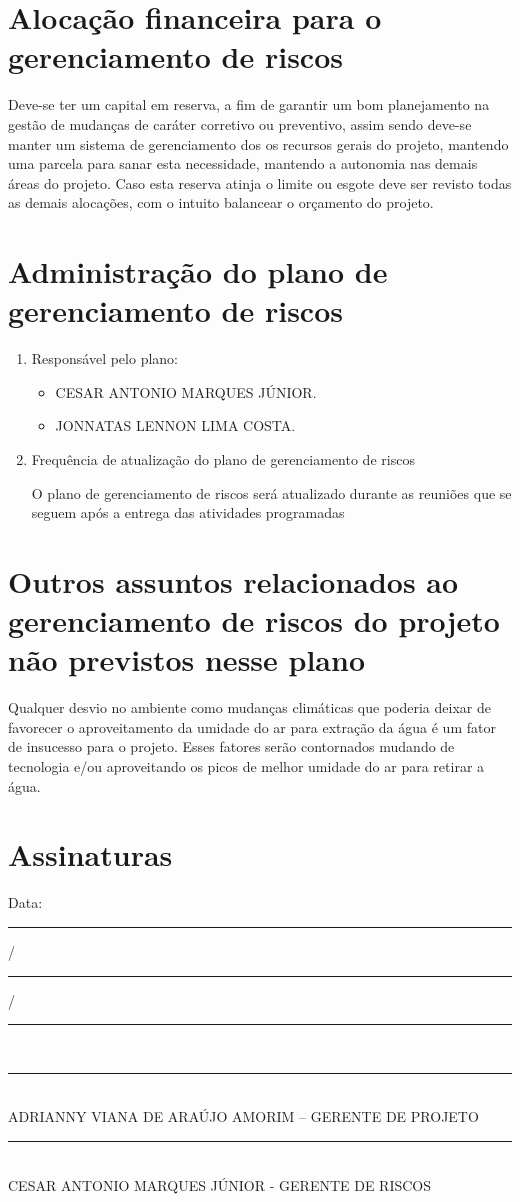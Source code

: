 \section*{Alocação financeira para o gerenciamento de riscos}
Deve-se ter um capital em reserva, a fim de garantir um bom planejamento na gestão de mudanças de caráter corretivo ou preventivo, assim sendo deve-se manter um sistema de gerenciamento dos os recursos gerais do projeto, mantendo uma parcela para sanar esta necessidade, mantendo a autonomia nas demais áreas do projeto.
Caso esta reserva atinja o limite ou esgote deve ser revisto todas as demais alocações, com o intuito balancear o orçamento do projeto.

\section*{Administração do plano de gerenciamento de riscos}
\begin{enumerate}
\item Responsável pelo plano:
\begin{itemize}
\item CESAR ANTONIO MARQUES JÚNIOR.
\item JONNATAS LENNON LIMA COSTA.
\end{itemize}
\item Frequência de atualização do plano de gerenciamento de riscos

O plano de gerenciamento de riscos será atualizado durante as reuniões que se seguem após a entrega das atividades programadas
\end{enumerate}

\section*{Outros assuntos relacionados ao gerenciamento de riscos do projeto não previstos nesse plano}
Qualquer desvio no ambiente como mudanças climáticas que poderia deixar de favorecer o aproveitamento da umidade do ar para extração da água é um fator de insucesso para o projeto. Esses fatores serão contornados mudando de tecnologia e/ou aproveitando os picos de melhor umidade do ar para retirar a água.

\section*{Assinaturas}
\begin{center}
Data: \rule{0.5cm}{0.1mm}/\rule{0.5cm}{0.1mm}/\rule{1cm}{0.1mm}     \\
\rule{13cm}{0.1mm}\\
ADRIANNY VIANA DE ARAÚJO AMORIM – GERENTE DE PROJETO\\
\rule{13cm}{0.1mm}\\
CESAR ANTONIO MARQUES JÚNIOR - GERENTE DE RISCOS


\end{center}
% 